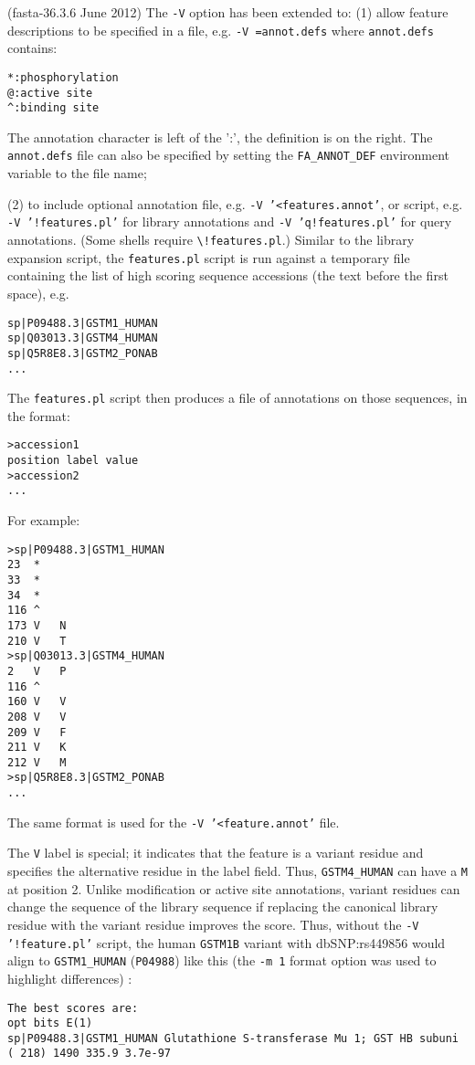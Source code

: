 \documentclass[11pt]{article}
\begin{document}
\begin{description}
(fasta-36.3.6 June 2012) The \texttt{-V} option has been extended to:
(1) allow feature descriptions to be specified in a file,
e.g. \texttt{-V =annot.defs} where \texttt{annot.defs} contains:
\begin{footnotesize}
\begin{verbatim}
*:phosphorylation
@:active site
^:binding site
\end{verbatim}
\end{footnotesize}
The annotation character is left of the  ':', the definition is on the
right.  The \texttt{annot.defs} file can also be specified by setting
the \texttt{FA\_ANNOT\_DEF} environment variable to the file name;

(2) to include optional annotation file, e.g. \texttt{-V
  '<features.annot'}, or script, e.g. \texttt{-V '!features.pl'} for
library annotations and \texttt{-V 'q!features.pl'} for query annotations. (Some shells require \texttt{\textbackslash!features.pl}.) Similar to the library expansion script, the
\texttt{features.pl} script is run against a temporary file containing
the list of high scoring sequence accessions (the text before the
first space), e.g.
\begin{footnotesize}
\begin{verbatim}
sp|P09488.3|GSTM1_HUMAN
sp|Q03013.3|GSTM4_HUMAN
sp|Q5R8E8.3|GSTM2_PONAB
...
\end{verbatim}
\end{footnotesize}
The \texttt{features.pl} script then produces a file of annotations on
those sequences, in the format:
\begin{verbatim}
>accession1
position label value
>accession2
...
\end{verbatim}
For example:
\begin{footnotesize}
\begin{verbatim}
>sp|P09488.3|GSTM1_HUMAN
23	*	
33	*	
34	*	
116	^	
173	V	N
210	V	T
>sp|Q03013.3|GSTM4_HUMAN
2	V	P
116	^	
160	V	V
208	V	V
209	V	F
211	V	K
212	V	M
>sp|Q5R8E8.3|GSTM2_PONAB
...
\end{verbatim}
\end{footnotesize}
The same format is used for the \texttt{-V '<feature.annot'} file.

The \texttt{V} label is special; it indicates that the feature is a
variant residue and specifies the alternative residue in the label
field.  Thus, \texttt{GSTM4\_HUMAN} can have a \texttt{M} at position
2.  Unlike modification or active site annotations, variant residues
can change the sequence of the library sequence if replacing the
canonical library residue with the variant residue improves the score.
Thus, without the \texttt{-V '!feature.pl'} script, the human
\texttt{GSTM1B} variant with dbSNP:rs449856 would align to
\texttt{GSTM1\_HUMAN} (\texttt{P04988}) like this (the \texttt{-m 1}
format option was used to highlight differences) :
\begin{footnotesize}
\begin{verbatim}
The best scores are:                                                          opt bits E(1)
sp|P09488.3|GSTM1_HUMAN Glutathione S-transferase Mu 1; GST HB subuni  ( 218) 1490 335.9 3.7e-97


\end{verbatim}
\end{footnotesize}
\end{description}
\end{document}
